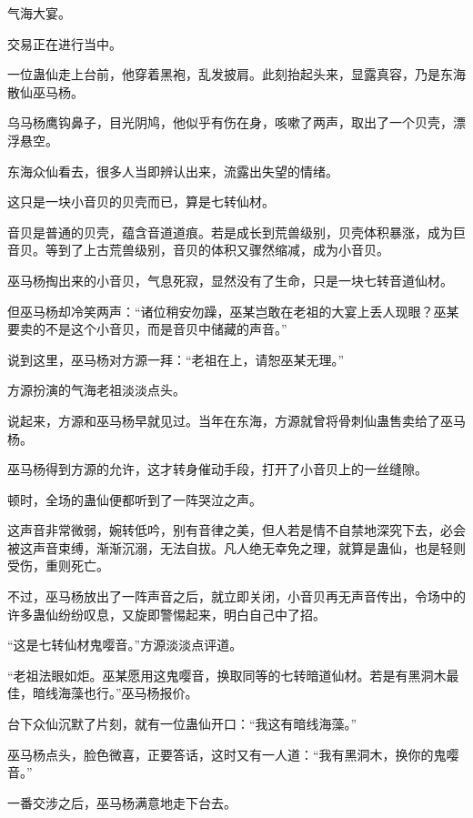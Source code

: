 
\begin{this_body}

气海大宴。

交易正在进行当中。

一位蛊仙走上台前，他穿着黑袍，乱发披肩。此刻抬起头来，显露真容，乃是东海散仙巫马杨。

乌马杨鹰钩鼻子，目光阴鸠，他似乎有伤在身，咳嗽了两声，取出了一个贝壳，漂浮悬空。

东海众仙看去，很多人当即辨认出来，流露出失望的情绪。

这只是一块小音贝的贝壳而已，算是七转仙材。

音贝是普通的贝壳，蕴含音道道痕。若是成长到荒兽级别，贝壳体积暴涨，成为巨音贝。等到了上古荒兽级别，音贝的体积又骤然缩减，成为小音贝。

巫马杨掏出来的小音贝，气息死寂，显然没有了生命，只是一块七转音道仙材。

但巫马杨却冷笑两声：“诸位稍安勿躁，巫某岂敢在老祖的大宴上丢人现眼？巫某要卖的不是这个小音贝，而是音贝中储藏的声音。”

说到这里，巫马杨对方源一拜：“老祖在上，请恕巫某无理。”

方源扮演的气海老祖淡淡点头。

说起来，方源和巫马杨早就见过。当年在东海，方源就曾将骨刺仙蛊售卖给了巫马杨。

巫马杨得到方源的允许，这才转身催动手段，打开了小音贝上的一丝缝隙。

顿时，全场的蛊仙便都听到了一阵哭泣之声。

这声音非常微弱，婉转低吟，别有音律之美，但人若是情不自禁地深究下去，必会被这声音束缚，渐渐沉溺，无法自拔。凡人绝无幸免之理，就算是蛊仙，也是轻则受伤，重则死亡。

不过，巫马杨放出了一阵声音之后，就立即关闭，小音贝再无声音传出，令场中的许多蛊仙纷纷叹息，又旋即警惕起来，明白自己中了招。

“这是七转仙材鬼嘤音。”方源淡淡点评道。

“老祖法眼如炬。巫某愿用这鬼嘤音，换取同等的七转暗道仙材。若是有黑洞木最佳，暗线海藻也行。”巫马杨报价。

台下众仙沉默了片刻，就有一位蛊仙开口：“我这有暗线海藻。”

巫马杨点头，脸色微喜，正要答话，这时又有一人道：“我有黑洞木，换你的鬼嘤音。”

一番交涉之后，巫马杨满意地走下台去。


\end{this_body}
